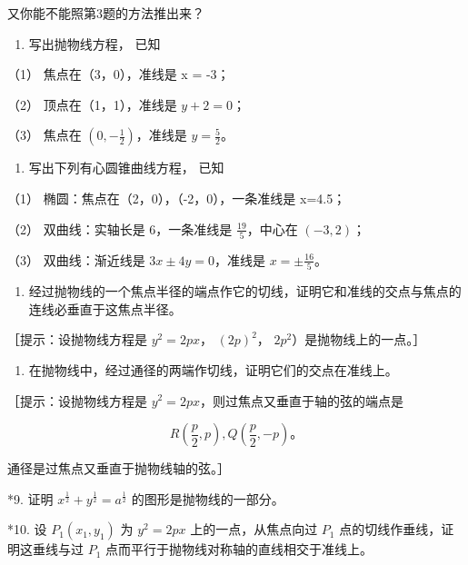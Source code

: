 又你能不能照第3题的方法推出来？

\begin{enumerate}
\def\labelenumi{\arabic{enumi}.}
\setcounter{enumi}{4}
\tightlist
\item
  写出抛物线方程， 已知
\end{enumerate}

（1） 焦点在（3，0），准线是 x = -3；

（2） 顶点在（1，1），准线是 \(y+2=0\)；

（3） 焦点在 \(\left(0,-\frac{1}{2}\right)\)，准线是 \(y=\frac{5}{2}\)。

\begin{enumerate}
\def\labelenumi{\arabic{enumi}.}
\setcounter{enumi}{5}
\tightlist
\item
  写出下列有心圆锥曲线方程， 已知
\end{enumerate}

（1） 椭圆：焦点在（2，0），（-2，0），一条准线是 x=4.5；

（2） 双曲线：实轴长是 6，一条准线是 \(\frac{19}{5}\)，中心在
\((-3, 2)\)；

（3） 双曲线：渐近线是 \(3x \pm 4y = 0\)，准线是
\(x = \pm \frac{16}{5}\)。

\begin{enumerate}
\def\labelenumi{\arabic{enumi}.}
\setcounter{enumi}{6}
\tightlist
\item
  经过抛物线的一个焦点半径的端点作它的切线，证明它和准线的交点与焦点的连线必垂直于这焦点半径。
\end{enumerate}

［提示：设抛物线方程是 \(y^{2}=2px\)， \((2p)^{2}\)，
\(2p^{2}\)）是抛物线上的一点。］

\begin{enumerate}
\def\labelenumi{\arabic{enumi}.}
\setcounter{enumi}{7}
\tightlist
\item
  在抛物线中，经过通径的两端作切线，证明它们的交点在准线上。
\end{enumerate}

［提示：设抛物线方程是 \(y^{2}=2px\)，则过焦点又垂直于轴的弦的端点是

\[
R \left(\frac {p}{2}, p\right), Q \left(\frac {p}{2}, - p\right)\text{。}
\]

通径是过焦点又垂直于抛物线轴的弦。］

*9. 证明 \(x^{\frac{1}{2}} + y^{\frac{1}{2}} = a^{\frac{1}{2}}\)
的图形是抛物线的一部分。

*10. 设 \(P_{1}(x_{1}, y_{1})\) 为 \(y^{2} = 2px\) 上的一点，从焦点向过
\(P_{1}\) 点的切线作垂线，证明这垂线与过 \(P_{1}\)
点而平行于抛物线对称轴的直线相交于准线上。


